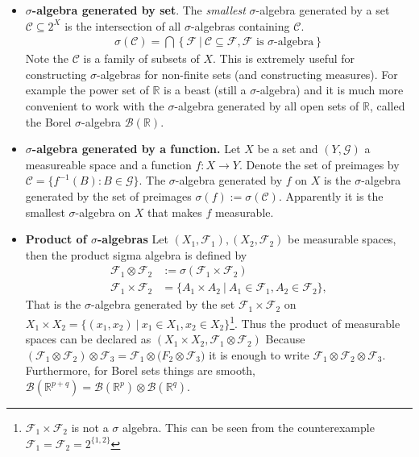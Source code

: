 \documentclass[10pt,a4paper]{article}
\begin{document}
\begin{itemize}
\item
 \textbf{$\sigma$-algebra generated by set}. The \textit{smallest} $\sigma$-algebra generated by a set $\mathcal C \subseteq 2^X$ is the intersection of all $\sigma$-algebras containing $\mathcal C$. 
\begin{align*}
	\sigma(\mathcal C) = \bigcap \left \{ \mathcal F  ~| ~ \mathcal C \subseteq  \mathcal F,  \mathcal F \text{ is }       \sigma\text{-algebra}    \right\}
\end{align*} 
Note the $\mathcal C$ is a family of subsets of $X$. This is extremely useful for constructing $\sigma$-algebras for non-finite sets (and constructing measures). For example the power set of $\mathbb R$ is  a beast (still a $\sigma$-algebra) and it is much more convenient to work with the  $\sigma$-algebra generated by all open sets of $\mathbb R$, called the Borel $\sigma$-algebra $\mathcal B (\mathbb R)$.

\item 
\textbf{$\sigma$-algebra generated by a function. } Let $X$ be a set and $(Y, \mathcal G)$ a measureable space and a function $f: X \rightarrow Y$. Denote the set of preimages by $\mathcal C = \{f^{-1}(B): B \in \mathcal G \}$. The $\sigma$-algebra generated by $f$  on $X$ is  the $\sigma$-algebra generated by the set of preimages $\sigma(f) := \sigma(\mathcal C) $.  Apparently it is the smallest $\sigma$-algebra on $X$ that makes $f$ measurable.

\item 
\textbf{Product of $\sigma$-algebras} Let $(X_1, \mathcal F_1), ( X_2, \mathcal F_2)$ be measurable spaces, then the product sigma algebra is defined by
\begin{align*}
	\mathcal F_1 \otimes \mathcal F_2& := \sigma(\mathcal F_1 \times \mathcal F_2 ) \\
	 \mathcal F_1 \times \mathcal F_2 &= \{A_1 \times A_2  ~|~ A_1 \in \mathcal F_1,  A_2 \in \mathcal F_2 \}, 
\end{align*}
That is the   $\sigma$-algebra generated by the set  $\mathcal F_1 \times \mathcal F_2$ on $X_1\times X_2 = \{(x_1, x_2)  ~|~ x_1 \in X_1, x_2 \in X_2 \}$\footnote{$\mathcal F_1 \times \mathcal F_2$ is not a $\sigma$ algebra. This can be seen from the counterexample $\mathcal F_1 =  \mathcal F_2 = 2^{\{1,2\}}$}. Thus the product of measurable spaces can be declared as $(X_1 \times X_2, \mathcal F_1 \otimes \mathcal F_2 )$ Because $(\mathcal F_1 \otimes \mathcal F_2)\otimes \mathcal F_3  = \mathcal F_1 \otimes \mathcal (F_2 \otimes \mathcal F_3)$ it is enough to write $\mathcal F_1 \otimes \mathcal F_2\otimes \mathcal F_3$. Furthermore, for Borel sets things are smooth, $\mathcal B(\mathbb R^{p+q}) = \mathcal B(\mathbb R^{p}) \otimes \mathcal B(\mathbb R^{q}) $.
	

\end{itemize}
\end{document}
